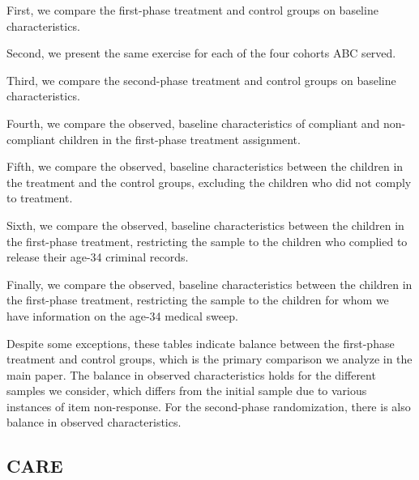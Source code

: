 \begin{appendices}
\noindent First, we compare the first-phase treatment and control groups on baseline characteristics. 



\noindent Second, we present the same exercise for each of the four cohorts ABC served.









\noindent Third, we compare the second-phase treatment and control groups on baseline characteristics. 



\noindent Fourth, we compare the observed, baseline characteristics of compliant and non-compliant children in the first-phase treatment assignment.



\noindent Fifth, we compare the observed, baseline characteristics between the children in the treatment and the control groups, excluding the children who did not comply to treatment.



\noindent Sixth, we compare the observed, baseline characteristics between the children in the first-phase treatment, restricting the sample to the children who complied to release their age-34 criminal records.



\noindent Finally, we compare the observed, baseline characteristics between the children in the first-phase treatment, restricting the sample to the children for whom we have information on the age-34 medical sweep.



\noindent Despite some exceptions, these tables indicate balance between the first-phase treatment and control groups, which is the primary comparison we analyze in the main paper. The balance in observed characteristics holds for the different samples we consider, which differs from the initial sample due to various instances of item non-response. For the second-phase randomization, there is also balance in observed characteristics.

\subsection{CARE}


\end{appendices}
